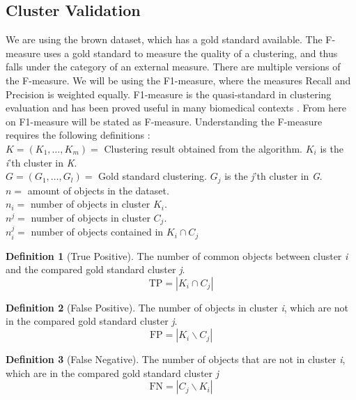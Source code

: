 \documentclass[a4paper,10pt]{article}
\theoremstyle{plain}
\theoremstyle{definition}
\newtheorem{defn}{Definition}
\begin{document}
\subsection{Cluster Validation}
\label{sec:clusterValidation}
We are using the brown dataset, which has a gold standard available. The F-measure uses a gold standard to measure the quality of a clustering, and thus falls under the category of an external measure. There are multiple versions of the F-measure. We will be using the F1-measure, where the measures Recall and Precision is weighted equally. F1-measure is the quasi-standard in clustering evaluation and has been proved useful in many biomedical contexts \cite{powerLimits}. From here on F1-measure will be stated as F-measure. Understanding the F-measure requires the following definitions \cite{powerLimits}:\\
$K = (K_1, \dots, K_m) = $ Clustering result obtained from the algorithm. $K_i$ is the \textit{i}'th cluster in \textit{K}.\\
$G = (G_1, \dots, G_l) = $ Gold standard clustering. $G_j$ is the \textit{j}'th cluster in \textit{G}.\\
$n = $ amount of objects in the dataset. \\
$n_i = $ number of objects in cluster $K_i$. \\
$n^j = $ number of objects in cluster $C_j$. \\
$n_{i}^{j} = $ number of objects contained in $K_i \cap C_j$

\begin{defn}[True Positive]\label{}
	The number of common objects between cluster \textit{i} and the compared gold standard cluster \textit{j}.
	\begin{equation}
		\text{TP} = |K_i \cap C_j|
	\end{equation}
\end{defn}

\begin{defn}[False Positive]\label{}
	The number of objects in cluster \textit{i}, which are not in the compared gold standard cluster \textit{j}.
	\begin{equation}
		\text{FP} = |K_i \backslash C_j|
	\end{equation}
\end{defn}

\begin{defn}[False Negative]\label{}
	The number of objects that are not in cluster \textit{i}, which are in the compared gold standard cluster \textit{j}
	\begin{equation}
		\text{FN} = |C_j \backslash K_i|
	\end{equation}
\end{defn}
\end{document}

